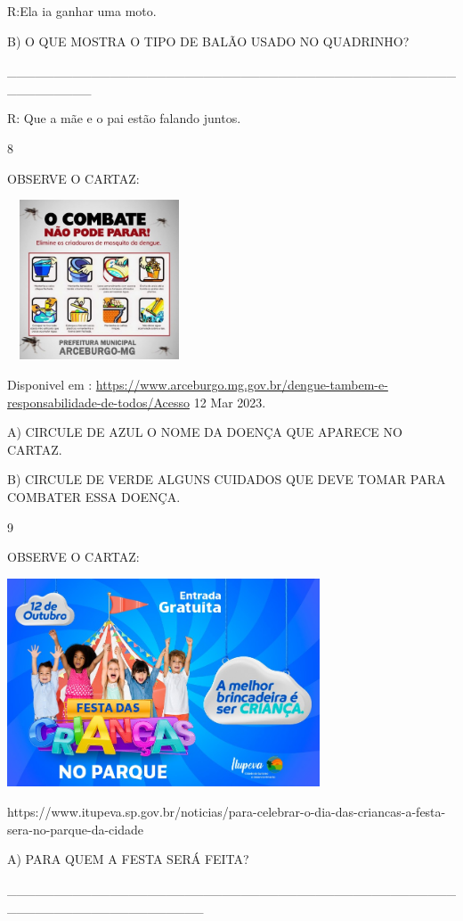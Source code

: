 {{{{{{R:Ela ia ganhar uma moto.

B) O QUE MOSTRA O TIPO DE BALÃO USADO NO QUADRINHO?

\_\_\_\_\_\_\_\_\_\_\_\_\_\_\_\_\_\_\_\_\_\_\_\_\_\_\_\_\_\_\_\_\_\_\_\_\_\_\_\_\_\_\_\_\_\_\_\_\_\_\_\_\_\_\_\_\_

R: Que a mãe e o pai estão falando juntos.

\num{8}

OBSERVE O CARTAZ:

\includegraphics[width=2.15306in,height=1.86730in]{media/image134.jpeg}

Disponivel em :
\url{https://www.arceburgo.mg.gov.br/dengue-tambem-e-responsabilidade-de-todos/Acesso}
12 Mar 2023.

A) CIRCULE DE AZUL O NOME DA DOENÇA QUE APARECE NO CARTAZ.

B) CIRCULE DE VERDE ALGUNS CUIDADOS QUE DEVE TOMAR PARA COMBATER ESSA
DOENÇA.

\num{9}

OBSERVE O CARTAZ:

\includegraphics[width=3.66026in,height=2.43572in]{media/image135.jpeg}

https://www.itupeva.sp.gov.br/noticias/para-celebrar-o-dia-das-criancas-a-festa-sera-no-parque-da-cidade

A) PARA QUEM A FESTA SERÁ FEITA?

\_\_\_\_\_\_\_\_\_\_\_\_\_\_\_\_\_\_\_\_\_\_\_\_\_\_\_\_\_\_\_\_\_\_\_\_\_\_\_\_\_\_\_\_\_\_\_\_\_\_\_\_\_\_\_\_\_\_\_\_\_\_\_\_\_\_\_\_\_

}}}}}}
